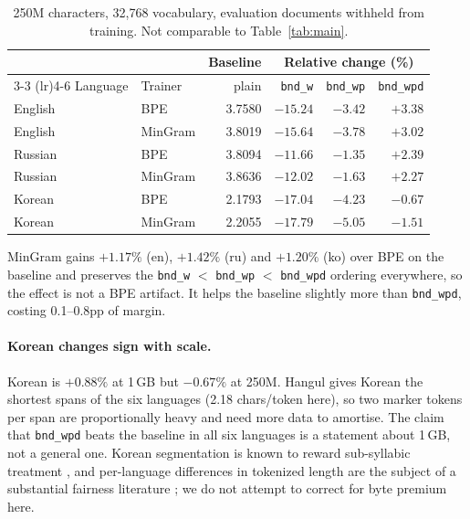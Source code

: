 \documentclass[11pt]{article}
\newcommand{\bnd}[1]{\texttt{bnd\_#1}}
\newcommand{\relchange}[1]{{\footnotesize #1}}
\begin{document}
\begin{table}[t]
\centering
\small
\begin{tabular}{llrrrr}
\toprule
& & \multicolumn{1}{c}{Baseline} & \multicolumn{3}{c}{Relative change (\%)} \\
\cmidrule(lr){3-3} \cmidrule(lr){4-6}
Language & Trainer & plain & \bnd{w} & \bnd{wp} & \bnd{wpd} \\
\midrule
English & BPE     & 3.7580 & \relchange{$-15.24$} & \relchange{$-3.42$} & $+3.38$ \\
English & MinGram & 3.8019 & \relchange{$-15.64$} & \relchange{$-3.78$} & $+3.02$ \\
Russian & BPE     & 3.8094 & \relchange{$-11.66$} & \relchange{$-1.35$} & $+2.39$ \\
Russian & MinGram & 3.8636 & \relchange{$-12.02$} & \relchange{$-1.63$} & $+2.27$ \\
Korean  & BPE     & 2.1793 & \relchange{$-17.04$} & \relchange{$-4.23$} & $-0.67$ \\
Korean  & MinGram & 2.2055 & \relchange{$-17.79$} & \relchange{$-5.05$} & $-1.51$ \\
\bottomrule
\end{tabular}
\caption{250M characters, 32{,}768 vocabulary, evaluation documents withheld from training.
Not comparable to Table~\ref{tab:main}.}
\label{tab:mingram}
\end{table}

MinGram gains $+1.17\%$ (en), $+1.42\%$ (ru) and $+1.20\%$ (ko) over BPE on the baseline and
preserves the \bnd{w} $<$ \bnd{wp} $<$ \bnd{wpd} ordering everywhere, so the effect is not a
BPE artifact. It helps the baseline slightly more than \bnd{wpd}, costing 0.1--0.8pp of
margin.

\paragraph{Korean changes sign with scale.} Korean is $+0.88\%$ at 1\,GB but $-0.67\%$ at
250M. Hangul gives Korean the shortest spans of the six languages (2.18 chars/token here),
so two marker tokens per span are proportionally heavy and need more data to amortise. The
claim that \bnd{wpd} beats the baseline in all six languages is a statement about 1\,GB, not
a general one. Korean segmentation is known to reward sub-syllabic treatment
\citep{lee-etal-2025-jamo}, and per-language differences in tokenized length are the subject
of a substantial fairness literature
\citep{petrov2023language,ahia-etal-2023-languages,arnett-etal-2024-bit,velayuthan-sarveswaran-2025-egalitarian};
we do not attempt to correct for byte premium here.
\end{document}
